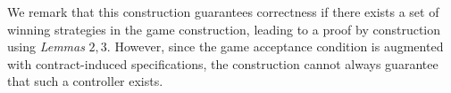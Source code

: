 We remark that this construction guarantees correctness if there exists a set of winning strategies in the game construction, leading to a proof by construction using \textit{Lemmas} $2,3$. However, since the game acceptance condition is augmented with contract-induced specifications, the construction cannot always guarantee that such a controller exists. 


